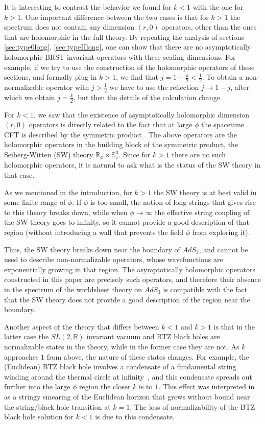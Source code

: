 \documentclass[12pt]{article}
\def\sqsphere{{\bS^3_\flat}}
\def\half{\frac12}
\newcommand{\bR}{{\mathbb R}}
\newcommand{\bS}{{\mathbb S}}
\numberwithin{equation}{section}
\def\half{\frac12}
\begin{document}
It is interesting to contrast the behavior we found for $k<1$ with the one for $k>1$. One important difference between the two cases is that for $k>1$ the spectrum does not contain any dimension $(r,0)$ operators, other than the ones that are holomorphic in the full theory.  By repeating the analysis of sections \ref{sec:type0long}, \ref{sec:typeIIlong}, one can show that there are no asymptotically holomorphic BRST invariant operators with these scaling dimensions. For example, if we try to use the construction of the holomorphic operators of these sections, and formally plug in $k>1$, we find that $j=1-\frac k2<\half$. To obtain a non-normalizable operator with $j>\half$ we have to use the reflection $j\to 1-j$, after which we obtain $j=\frac k2$, but then the details of the calculation change. 

For $k<1$, we saw that the existence of asymptotically holomorphic dimension $(r,0)$ operators is directly related to the fact that at large $\phi$ the spacetime CFT is described by the symmetric product \ourcft. The above operators are the holomorphic operators in the building block of the symmetric product, the Seiberg-Witten (SW) theory $\bR_\phi\times \sqsphere$. Since for $k>1$ there are no such holomorphic operators, it is natural to ask what is the status of the SW theory in that case. 

As we mentioned in the introduction, for $k>1$ the SW theory is at best valid in some finite range of $\phi$. If $\phi$ is too small, the notion of long strings that gives rise to this theory breaks down, while when $\phi\to\infty$ the effective string coupling of the SW theory goes to infinity, so it cannot provide a good description of that region (without introducing a wall that prevents the field $\phi$ from exploring it). 

Thus, the SW theory breaks down near the boundary of $AdS_3$, and cannot be used to describe non-normalizable operators, whose wavefunctions are exponentially growing in that region. The asymptotically holomorphic operators constructed in this paper are precisely such operators, and therefore their absence in the spectrum of the worldsheet theory on $AdS_3$ is compatible with the fact that the SW theory does not provide a good description of the region near the boundary. 

Another aspect of the theory that differs between $k<1$ and $k>1$ is that in the latter case the $SL(2,\bR)$ invariant vacuum and BTZ black holes are normalizable states in the theory, while in the former case they are not. As $k$ approaches $1$ from above, the nature of these states changes. For example, the (Euclidean) BTZ black hole involves a condensate of a fundamental string winding around the thermal circle at infinity~, and this condensate spreads out further into the large $\phi$ region the closer $k$ is to $1$. This effect was interpreted in~ as a stringy smearing of the Euclidean horizon that grows without bound near the string/black hole transition at $k=1$. The loss of normalizability of the BTZ black hole solution for $k<1$ is due to this condensate. 
\end{document}
